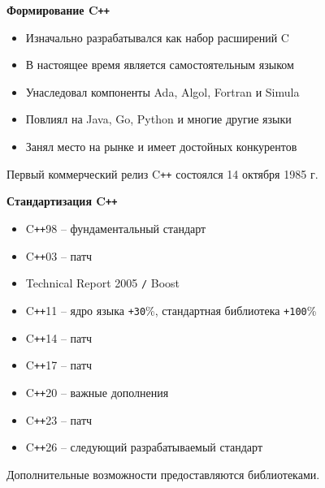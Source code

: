 \documentclass{beamer} %
\begin{document}
\begin{frame}{\bf Формирование C\texttt{++}}
    
    \begin{itemize}

        \item Изначально разрабатывался как набор расширений C

        \item В настоящее время является самостоятельным языком

        \item Унаследовал компоненты Ada, Algol, Fortran и Simula

        \item Повлиял на Java, Go, Python и многие другие языки

        \item Занял место на рынке и имеет достойных конкурентов
         
    \end{itemize}

    \begin{block}
    \justifying Первый коммерческий релиз C\texttt{++} состоялся 14 октября 1985 г.
    \end{block}
    
\end{frame}

\begin{frame}{\bf Стандартизация C\texttt{++}}

    \begin{itemize}

        \item C\texttt{++}98 -- фундаментальный стандарт

        \item C\texttt{++}03 -- патч

        \item Technical Report 2005 \texttt{/} Boost

        \item C\texttt{++}11 -- ядро языка \texttt{+30}\%, стандартная библиотека \texttt{+100}\%

        \item C\texttt{++}14 -- патч

        \item C\texttt{++}17 -- патч

        \item C\texttt{++}20 -- важные дополнения

        \item C\texttt{++}23 -- патч

        \item C\texttt{++}26 -- следующий разрабатываемый стандарт
         
    \end{itemize}

    \begin{block}
    \justifying Дополнительные возможности предоставляются библиотеками.
    \end{block}
    
\end{frame}
\end{document}
